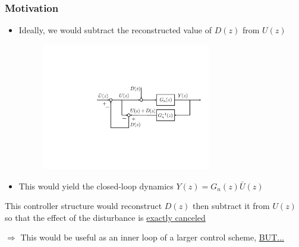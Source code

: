 \begin{frame}
    \frametitle{Motivation}
    \begin{itemize}
    \item
    Ideally, we would subtract the reconstructed value of $D(z)$ from $U(z)$
    \begin{figure}
        \includegraphics[width=0.7\textwidth]{Disturbance_Observer_motiv4}\\
    \end{figure}
    \pause

    \item
    This would yield the closed-loop dynamics $Y(z) = G_n(z) \bar{U}(z)$
    \end{itemize}
    \pause


    This controller structure would reconstruct $D(z)$ then subtract it from $U(z)$ so that the effect of the disturbance is \underline{exactly canceled}
    \pause

    $\Rightarrow$ This would be useful as an inner loop of a larger control scheme, \underline{BUT...}

\end{frame}

